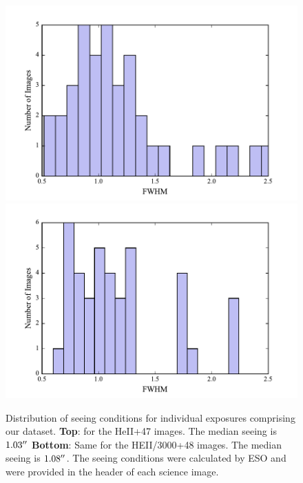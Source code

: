 \documentclass[twocolumn]{aastex6}
\begin{document}
\begin{figure}[h]
\centering
\includegraphics[scale=.55]{../Figures/avg_seeing_HEII.pdf}
\includegraphics[scale=.55]{../Figures/avg_seeing_HEII3000.pdf}
\caption{  Distribution of seeing conditions for individual exposures comprising our dataset.
\textbf{Top}: for the HeII+47 images. The median seeing is $1.03\mbox{$^{\prime\prime}$}$ 
\textbf{Bottom}: Same for the HEII/3000+48 images. The median seeing is $1.08\mbox{$^{\prime\prime}$}$. 
The seeing conditions were calculated by ESO and were provided in the header of each science image.}
\end{figure}
\end{document}

